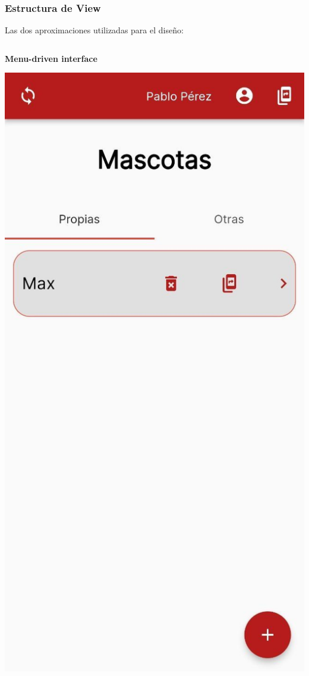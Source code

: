 \documentclass[14pt]{beamer}
\begin{document}
\begin{frame}
\frametitle{Estructura de View}
Las dos aproximaciones utilizadas para el diseño:

\begin{columns}
\begin{column}{0.5\textwidth}
\textbf{Menu-driven interface}
\begin{center}

\includegraphics[scale = 0.12]{Images/homePage.jpg}


\end{center}
\end{column}
\end{columns}
\end{frame}
\end{document}
